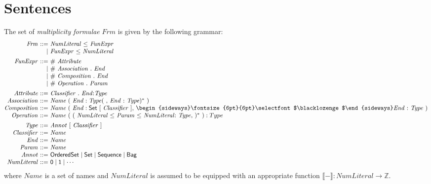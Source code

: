 \documentclass[10pt,fleqn,final]{scrreprt}
\newenvironment{definitions}[0]{\medskip }{}
\newcommand{\composition}{\raisebox{0.2pt}{\begin{sideways}\fontsize{6pt}{6pt}\selectfont$\blacklozenge$\end{sideways}}}
\newcommand{\NZ}{\mathbb{Z}}
\newcommand{\sem}[1]{\mathopen\llbracket#1\mathclose\rrbracket}
\begin{document}
\begin{definitions}
\section{Sentences}

The set of \emph{multiplicity formulae} $\mathit{Frm}$ is given by
the following grammar:
%
\begin{equation*}
\begin{array}{@{}r@{\ }r@{\ }l@{}}
  \mathit{Frm} & ::= & \mathit{NumLiteral}\ \mathsf{\leq}\ \mathit{FunExpr}\\
               &   | & \mathit{FunExpr}\ \mathsf{\leq}\ \mathit{NumLiteral}
\\[1ex]
  \mathit{FunExpr} & ::= & \mathit{\#}\ \mathit{Attribute}\\
                   &   | & \mathit{\#}\ \mathit{Association}\ \mathsf{.}\ \mathit{End}\\
                   &   | & \mathit{\#}\ \mathit{Composition}\ \mathsf{.}\ \mathit{End}
\\
                   &   | & \mathit{\#}\ \mathit{Operation}\ \mathsf{.}\ \mathit{Param}
\\[1ex]
  \mathit{Attribute} & ::= & \mathit{Classifier}\ \mathsf{.}\ \mathit{End} \mathsf{:} \mathit{Type}
\\
  \mathit{Association} & ::= & \mathit{Name}\ (\ \mathit{End} : \mathit{Type}(\ \mathsf{,}\ \mathit{End}\ \mathsf{:}\ \mathit{Type})^*\ )
\\
  \mathit{Composition} & ::= & \mathit{Name}\ (\ \mathit{End} : \mathsf{Set}\ [\ \mathit{Classifier}\ ]\mathsf{,}\ \composition \mathit{End}\ \mathsf{:}\ \mathit{Type}\ )
\\
  \mathit{Operation} & ::= & \mathit{Name}\ (\  (\  \mathit{NumLiteral}\ \mathsf{\leq}\ \mathit{Param}\  \mathsf{\leq}\ \mathit{NumLiteral} \mathsf{:}\ \mathit{Type} \mathsf{,}\ )^*\ ) : Type
\\[1ex]
  \mathit{Type} & ::= & \mathit{Annot}\ \mathsf{[}\ \mathit{Classifier}\ \mathsf{]}
\\
  \mathit{Classifier} & ::= & \mathit{Name}
\\
  \mathit{End} & ::= & \mathit{Name}
\\
  \mathit{Param} & ::= & \mathit{Name}
\\
  \mathit{Annot} & ::= & \mathsf{OrderedSet} \mid \mathsf{Set} \mid \mathsf{Sequence} \mid \mathsf{Bag}
\\
  \mathit{NumLiteral} & ::= & \mathsf{0} \mid \mathsf{1} \mid \cdots
\end{array}
\end{equation*}
%
where $\mathit{Name}$ is a set of names and $\mathit{NumLiteral}$ is
assumed to be equipped with an appropriate function
$\sem{-} : \mathit{NumLiteral} \to \NZ$.


\end{definitions}
\end{document}
